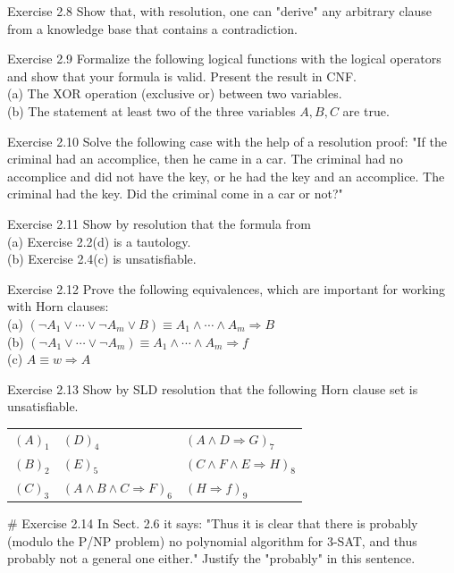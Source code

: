 \documentclass[10pt]{book}
\begin{document}
Exercise 2.8 Show that, with resolution, one can "derive" any arbitrary clause from a knowledge base that contains a contradiction.

Exercise 2.9 Formalize the following logical functions with the logical operators and show that your formula is valid. Present the result in CNF.\\
(a) The XOR operation (exclusive or) between two variables.\\
(b) The statement at least two of the three variables $A, B, C$ are true.

Exercise 2.10 Solve the following case with the help of a resolution proof: "If the criminal had an accomplice, then he came in a car. The criminal had no accomplice and did not have the key, or he had the key and an accomplice. The criminal had the key. Did the criminal come in a car or not?"

Exercise 2.11 Show by resolution that the formula from\\
(a) Exercise 2.2(d) is a tautology.\\
(b) Exercise 2.4(c) is unsatisfiable.

Exercise 2.12 Prove the following equivalences, which are important for working with Horn clauses:\\
(a) $\left(\neg A_{1} \vee \cdots \vee \neg A_{m} \vee B\right) \equiv A_{1} \wedge \cdots \wedge A_{m} \Rightarrow B$\\
(b) $\left(\neg A_{1} \vee \cdots \vee \neg A_{m}\right) \equiv A_{1} \wedge \cdots \wedge A_{m} \Rightarrow f$\\
(c) $A \equiv w \Rightarrow A$

Exercise 2.13 Show by SLD resolution that the following Horn clause set is unsatisfiable.

\begin{center}
\begin{tabular}{lll}
$(A)_{1}$ & $(D)_{4}$ & $(A \wedge D \Rightarrow G)_{7}$ \\
$(B)_{2}$ & $(E)_{5}$ & $(C \wedge F \wedge E \Rightarrow H)_{8}$ \\
$(C)_{3}$ & $(A \wedge B \wedge C \Rightarrow F)_{6}$ & $(H \Rightarrow f)_{9}$ \\
\end{tabular}
\end{center}

\# Exercise 2.14 In Sect. 2.6 it says: "Thus it is clear that there is probably (modulo the P/NP problem) no polynomial algorithm for 3-SAT, and thus probably not a general one either." Justify the "probably" in this sentence.
\end{document}

